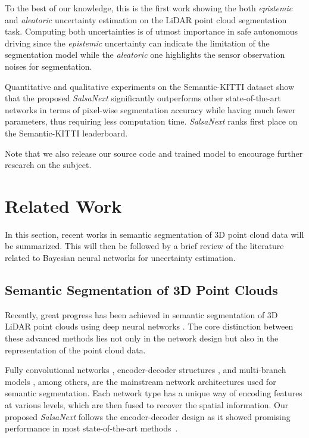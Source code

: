\documentclass[letterpaper, 10 pt, conference]{ieeeconf}
\newcommand{\snx}[1]{\textit{SalsaNext }{#1}}
\newcommand{\sk}[1]{Semantic-KITTI {#1}}
\begin{document}
To the best of our knowledge, this is the first work showing the both   \textit{epistemic}   and  \textit{aleatoric} uncertainty estimation on the   LiDAR point cloud segmentation task. 
Computing both uncertainties is of utmost importance in safe autonomous driving since the \textit{epistemic} uncertainty can indicate the limitation of the segmentation model while the  \textit{aleatoric} one highlights the sensor observation noises for segmentation.
  
Quantitative and qualitative experiments on the \sk dataset \cite{semantickitti} show that the proposed \snx significantly outperforms other state-of-the-art     networks in terms of pixel-wise segmentation accuracy while having much fewer parameters, thus requiring less computation time. \snx ranks first place on the \sk leaderboard.

Note that we also release our source code and trained model to encourage further research on the subject.




 
 
\section{Related Work}

In this section, recent works in  semantic segmentation of 3D point cloud data will be summarized.
This will then be followed by  a brief review of the literature related to Bayesian neural networks for uncertainty estimation.
 
\subsection{Semantic Segmentation of 3D Point Clouds}
\label{sec:semseg}
 
Recently, great progress has been achieved  in semantic segmentation of 3D LiDAR point clouds  using deep neural networks \cite{salsanet2020,SqueezesegV01,rangenetpp,SqueezesegV02,PointSeg18}.
The core distinction between these advanced methods lies not only in the network design but also in the representation of the point cloud  data.

Fully convolutional networks \cite{fcn2016}, encoder-decoder structures \cite{Zhang2018}, and multi-branch models \cite{FastSCNN2019}, among others, are the mainstream network   architectures used for semantic segmentation. Each network type has a unique way of encoding features at various levels, which are then fused to recover the spatial information. 
Our proposed \snx follows the encoder-decoder design as it showed promising  performance in most state-of-the-art methods~\cite{SqueezesegV01,SqueezesegV02,Unet}. 
\end{document}

